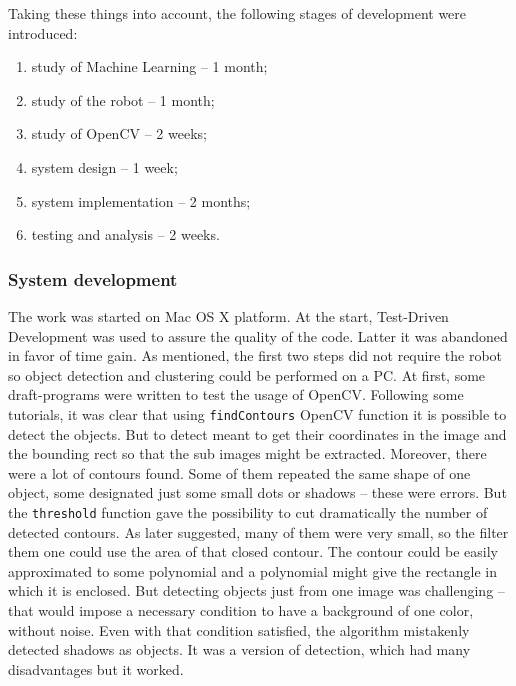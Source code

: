         Taking these things into account, the following stages of development were introduced:
        \begin{enumerate}[topsep=2pt, partopsep=0pt,itemsep=0pt,parsep=1pt]
            \item study of Machine Learning -- 1 month;
            \item study of the robot -- 1 month;
            \item study of OpenCV -- 2 weeks;
            \item system design -- 1 week;
            \item system implementation -- 2 months;
            \item testing and analysis -- 2 weeks.
        \end{enumerate}

    \subsubsection{System development}

        The work was started on Mac OS X platform. At the start, Test-Driven Development was used to assure the quality of the code. Latter it was abandoned in favor of time gain. As mentioned, the first two steps did not require the robot so object detection and clustering could be performed on a PC. At first, some draft-programs were written to test the usage of OpenCV. Following some tutorials, it was clear that using \verb|findContours| OpenCV function it is possible to detect the objects. But to detect meant to get their coordinates in the image and the bounding rect so that the sub images might be extracted. Moreover, there were a lot of contours found. Some of them repeated the same shape of one object, some designated just some small dots or shadows -- these were errors. But the \verb|threshold| function gave the possibility to cut dramatically the number of detected contours. As later suggested, many of them were very small, so the filter them one could use the area of that closed contour. The contour could be easily approximated to some polynomial and a polynomial might give the rectangle in which it is enclosed. But detecting objects just from one image was challenging -- that would impose a necessary condition to have a background of one color, without noise. Even with that condition satisfied, the algorithm mistakenly detected shadows as objects. It was a version of detection, which had many disadvantages but it worked.

